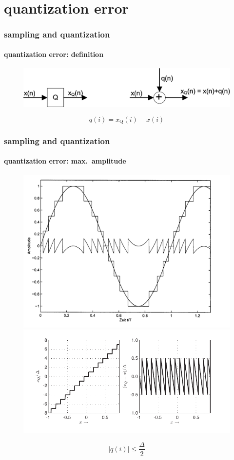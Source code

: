 \section[error]{quantization error}
	\begin{frame}\frametitle{sampling and quantization}\framesubtitle{quantization error: definition}
		\begin{figure}
			\centering
			 \includegraphics[scale=0.13]{Graph/Flowchart_Quantization}
		\end{figure}
		\begin{equation*}
			q(i) = x_{\mathrm{Q}}(i) - x(i)
		\end{equation*}
	\end{frame}		
	\begin{frame}\frametitle{sampling and quantization}\framesubtitle{quantization error: max.\ amplitude}
		\begin{figure}
			\centering
				\includegraphics[scale=.3]{Graph/quant+quanterror}
				\includegraphics[scale=.55]{graph/quant}
		\end{figure}
        \pause
		\begin{equation*}
			|q(i)| \leq \frac{\Delta}{2}
		\end{equation*}
	\end{frame}		

